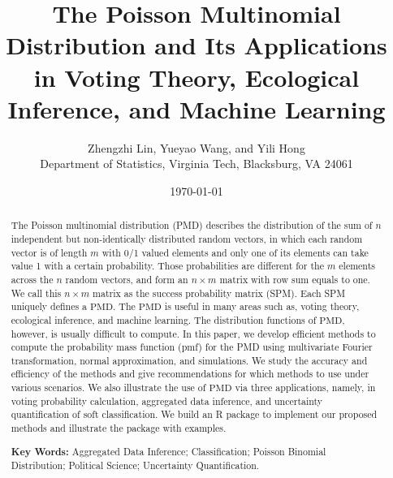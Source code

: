 \documentclass[12pt]{article}
\newcommand{\PMD}{\textrm{PMD}}
\begin{document}


\title{The Poisson Multinomial Distribution and Its Applications in Voting Theory, Ecological Inference, and Machine Learning}


\author{
Zhengzhi Lin, Yueyao Wang, and Yili Hong\\[1.5ex]
{Department of Statistics, Virginia Tech, Blacksburg, VA 24061}
}
	
\date{\today}
	
\maketitle
\begin{abstract}
The Poisson multinomial distribution (PMD) describes the distribution of the sum of $n$ independent but non-identically distributed random vectors, in which each random vector is of length $m$ with 0/1 valued elements and only one of its elements can take value 1 with a certain probability. Those probabilities are different for the $m$ elements across the $n$ random vectors, and form an $n \times m$ matrix with row sum equals to one. We call this $n\times m$ matrix as the success probability matrix (SPM). Each SPM uniquely defines a $\PMD$. The $\PMD$ is useful in many areas such as, voting theory, ecological inference, and machine learning. The distribution functions of $\PMD$, however, is usually difficult to compute. In this paper, we develop efficient methods to compute the probability mass function (pmf) for the PMD using multivariate Fourier transformation, normal approximation, and simulations. We study the accuracy and efficiency of the methods and give recommendations for which methods to use under various scenarios. We also illustrate the use of $\PMD$ via three applications, namely, in voting probability calculation, aggregated data inference, and uncertainty quantification of soft classification. We build an R package to implement our proposed methods and illustrate the package with examples.

\textbf{Key Words:} Aggregated Data Inference; Classification; Poisson Binomial Distribution; Political Science; Uncertainty Quantification.
\end{abstract}
	
\end{document}
